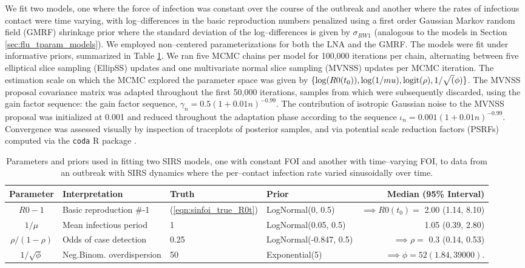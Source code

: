 We fit two models, one where the force of infection was constant over the course of the outbreak and another where the rates of infectious contact were time varying, with log--differences in the basic reproduction numbers penalized using a first order Gaussian Markov random field (GMRF) shrinkage prior where the standard deviation of the log--differences is given by $ \sigma_{RW1} $ (analogous to the models in Section \ref{sec:flu_tparam_models}). We employed non--centered parameterizations for both the LNA and the GMRF. The models were fit under informative priors, summarized in Table \ref{tab:tparam_sim_priors}. We ran five MCMC chains per model for 100,000 iterations per chain, alternating between five elliptical slice sampling (EllipSS) updates and one multivariate normal slice sampling (MVNSS) updates per MCMC iteration. The estimation scale on which the MCMC explored the parameter space was given by $\lbrace \log(R0(t_0)), \log(1/mu), \mathrm{logit}(\rho), 1/\sqrt(\phi) \rbrace$. The MVNSS proposal covariance matrix was adapted throughout the first 50,000 iterations, samples from which were subsequently discarded, using the gain factor sequence: the gain factor sequence, $\gamma_n = 0.5(1 + 0.01n)^{-0.99}$. The contribution of isotropic Gaussian noise to the MVNSS proposal was initialized at 0.001 and reduced throughout the adaptation phase according to the sequence $ \iota_n = 0.001(1 + 0.01n)^{-0.99} $. Convergence was assessed visually by inspection of traceplots of posterior samples, and via potential scale reduction factors (PSRFs) \cite{brooks1998general} computed via the \texttt{coda} R package \cite{codapackage}.

\begin{table}[htbp]
	\caption[Parameters and priors for models fit two SIRS models to data from a simulated outbreak with sinusoidal FOI.]{Parameters and priors used in fitting two SIRS models, one with constant FOI and another with time--varying FOI, to data from an outbreak with SIRS dynamics where the per--contact infection rate varied sinusoidally over time.}
	\label{tab:tparam_sim_priors}
	\scriptsize\centering
	\begin{tabular}{clllr}
		\hline
		\textbf{Parameter} & \textbf{Interpretation} & \textbf{Truth} & \textbf{Prior} & \textbf{Median (95\% Interval)} \\ \hline
		$ R0-1 $ & Basic reproduction \#-1 & (\ref{eqn:sinfoi_true_R0t}) & LogNormal(0, 0.5) & $ \implies R0(t_0) = $ 2.00 (1.14, 8.10) \\ 
		$ 1/\mu $ & Mean infectious period & 1&  LogNormal(0.05, 0.5)& 1.05 (0.39, 2.80) \\
		$ \rho/(1-\rho)  $ & Odds of case detection  &0.25&  LogNormal(-0.847, 0.5) & $ \implies \rho =$ 0.3 (0.14, 0.53) \\
		$ 1/\sqrt{\phi} $ & Neg.Binom. overdispersion & 50 & Exponential(5)& $ \implies \phi = 52 (1.84, 39000) $.  \\
		\hline
	\end{tabular}
\end{table}

